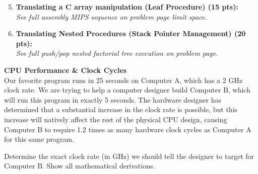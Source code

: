 \documentclass[letterpaper]{report}
\begin{document}
\begin{minipage}[t][7in][s]{0.48\textwidth}
\begin{enumerate}[\bf 1.]
\setcounter{enumi}{4}
    \item \textbf{Translating a C array manipulation (Leaf Procedure) (15 pts):} \\
    {\color{red} \textit{See full assembly MIPS sequence on problem page limit space.}}
    \vfill
    
    \item \textbf{Translating Nested Procedures (Stack Pointer Management) (20 pts):} \\
    {\color{red} \textit{See full push/pop nested factorial tree execution on problem page.}}
    \vfill
\end{enumerate}
\end{minipage}

\newpage

%
 {\bf CPU Performance \& Clock Cycles} \\
Our favorite program runs in 25 seconds on $\text{Computer A}$, which has a 2 GHz clock rate. We are trying to help a computer designer build $\text{Computer B}$, which will run this program in exactly 5 seconds. The hardware designer has determined that a substantial increase in the clock rate is possible, but this increase will natively affect the rest of the physical CPU design, causing $\text{Computer B}$ to require 1.2 times as many hardware clock cycles as $\text{Computer A}$ for this same program. 

Determine the exact clock rate (in GHz) we should tell the designer to target for $\text{Computer B}$. Show all mathematical derivations.
\end{document}
